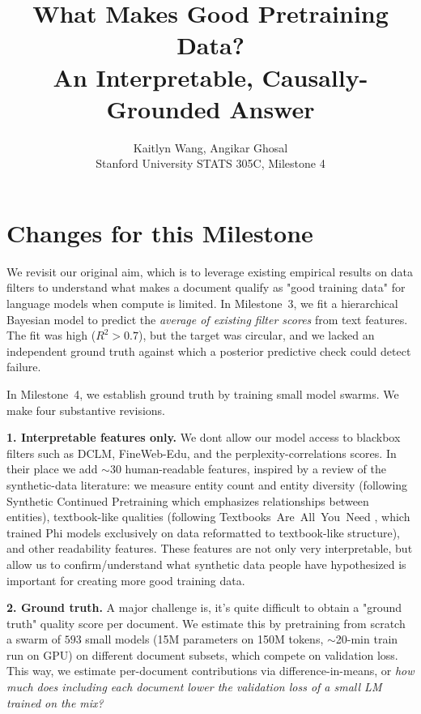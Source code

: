 \documentclass[twocolumn,letterpaper,10pt]{article}
\title{\vspace{-0.2in}\textbf{What Makes Good Pretraining Data?\\An Interpretable, Causally-Grounded Answer}}
\author{Kaitlyn Wang, Angikar Ghosal\\Stanford University \textendash{} STATS 305C, Milestone 4}
\begin{document}
\maketitle
\vspace{-0.25in}

\section{Changes for this Milestone}
\label{sec:intro}

We revisit our original aim, which is to leverage existing empirical results on data filters to understand what makes a document qualify as "good training data" for language models when compute is limited. In Milestone~3, we 
fit a hierarchical Bayesian model to predict
the \emph{average of existing filter scores} from text features. The
fit was high ($R^2 > 0.7$), but the target was circular, and we lacked an independent ground truth
against which a posterior predictive check could detect failure.

In Milestone~4, we establish ground truth by training small model swarms. We make four substantive revisions.

\textbf{1. Interpretable features only.} We dont allow our model access to blackbox filters such as DCLM, FineWeb-Edu,
and the perplexity-correlations scores. In their place we add $\sim 30$ human-readable features,
inspired by a review of the synthetic-data literature: we measure entity count and entity diversity (following Synthetic Continued Pretraining
\citep{yang2024entigraph} which emphasizes relationships between entities), textbook-like qualities
(following Textbooks~Are~All~You~Need \citep{gunasekar2023textbooks}, which trained Phi models exclusively on data reformatted to textbook-like structure),
and other readability features. 
These features are not only very interpretable, but allow us to confirm/understand what synthetic data people have hypothesized is important for creating more good training data. 

\textbf{2. Ground truth.} A major challenge is, it's quite difficult to obtain a "ground truth" quality score per document. We estimate this by pretraining from scratch a swarm of $593$ small models (15M parameters on 150M tokens, $\sim$20-min train run on GPU) on different
document subsets, which compete on validation loss.
This way, we estimate per-document contributions via
difference-in-means, or \textit{how much does including each document lower
the validation loss of a small LM trained on the mix?}
\end{document}
